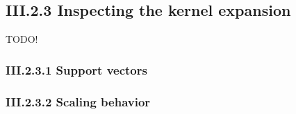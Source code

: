 \documentclass{article}
\theoremstyle{dotless}
\newcounter{min}
\newcommand{\Section}[1]{\section{#1}
\setcounter{min}{1}}
\begin{document}
\subsection{III.2.3 Inspecting the kernel expansion}

TODO!

\subsubsection{III.2.3.1 Support vectors}

\subsubsection{III.2.3.2 Scaling behavior}










\end{document}
